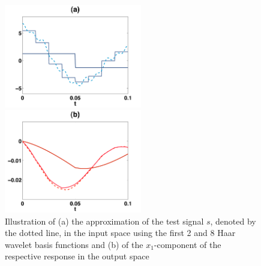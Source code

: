 \documentclass[a4paper,10pt,BCOR=15mm]{scrbook}
\begin{document}
\begin{figure}[htbp]
  \centering
  \begin{minipage}[b]{6 cm}
    \includegraphics[width=6cm]{pics/fullOpti/new/testSig_ul1_ul3.pdf}  
  \end{minipage}
  \begin{minipage}[b]{6 cm}
    \includegraphics[width=6cm]{pics/fullOpti/new/testSig_yl1_yl3.pdf}  
  \end{minipage}
  \caption{Illustration of (a) the approximation of the test signal $s$, denoted by the dotted line, in the input space using the first 2 and 8 Haar wavelet basis functions and (b) of the $x_1$-component of the respective response in the output space }
  \label{sigap}
\end{figure}
\end{document}
